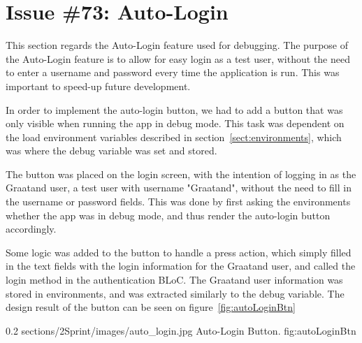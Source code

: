 \section{Issue \#73: Auto-Login}
\label{sect:autoFill}
This section regards the Auto-Login feature used for debugging. The purpose of the Auto-Login feature is to allow for easy login as a test user, without the need to enter a username and password every time the application is run. This was important to speed-up future development.

In order to implement the auto-login button, we had to add a button that was only visible when running the app in debug mode. This task was dependent on the load environment variables described in section~\ref{sect:environments}, which was where the debug variable was set and stored. 

The button was placed on the login screen, with the intention of logging in as the Graatand user, a test user with username "Graatand", without the need to fill in the username or password fields.
This was done by first asking the environments whether the app was in debug mode, and thus render the auto-login button accordingly.

Some logic was added to the button to handle a press action, which simply filled in the text fields with the login information for the Graatand user, and called the login method in the authentication BLoC. The Graatand user information was stored in environments, and was extracted similarly to the debug variable. The design result of the button can be seen on figure~\ref{fig:autoLoginBtn}

        {0.2} %
        {sections/2Sprint/images/auto_login.jpg} %
        {Auto-Login Button.} %
        {fig:autoLoginBtn} %